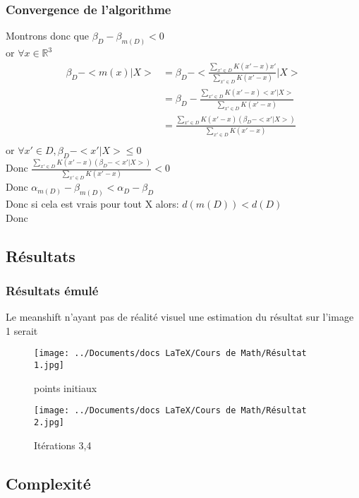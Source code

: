 \documentclass{beamer}
\newcommand{\R}{\mathbb{R}}
\begin{document}
\begin{frame}
\frametitle{Convergence de l'algorithme}
Montrons donc que  $\beta_{D} - \beta_{m(D)} < 0 $\\
or $\forall x \in \R^3$
\scriptsize
\begin{align*}
\beta_{D} - <m(x)|X> &= \beta_D - <\frac{\sum_{x' \in D} K(x' - x)x'}{\sum_{x' \in D} K(x' - x)}|X>\\
&= \beta_D - \frac{\sum_{x' \in D} K(x' - x)<x'|X>}{\sum_{x' \in D} K(x' - x)}\\
&= \frac{\sum_{x' \in D} K(x' - x)(\beta_D - <x'|X>)}{\sum_{x' \in D} K(x' - x)}\\
\end{align*}
\normalsize
or $\forall x' \in D, \beta_D - <x'|X> \leq 0$\\
Donc $\frac{\sum_{x' \in D} K(x' - x)(\beta_D - <x'|X>)}{\sum_{x' \in D} K(x' - x)} < 0$\\
Donc $\alpha_{m(D)} - \beta_{m(D)} < \alpha_{D} - \beta_{D}$\\
Donc si cela est vrais pour tout X alors: $d(m(D)) < d(D)$\\
Donc  
\end{frame}

\subsection*{Résultats}

\begin{frame}
\frametitle{Résultats émulé}
Le meanshift n'ayant pas de réalité visuel une estimation du résultat  sur l'image 1 serait
\begin{figure}
\begin{minipage}[c]{.55\linewidth}
        \centering
        \texttt{[image: ../Documents/docs LaTeX/Cours de Math/Résultat 1.jpg]}
        \caption{points initiaux}
    \end{minipage}
	\begin{minipage}[c]{.39\linewidth}
        \centering
        \texttt{[image: ../Documents/docs LaTeX/Cours de Math/Résultat 2.jpg]}
        \caption{Itérations 3,4}
	\end{minipage}
\end{figure}
\end{frame}

\subsection*{Complexité}
\end{document}
